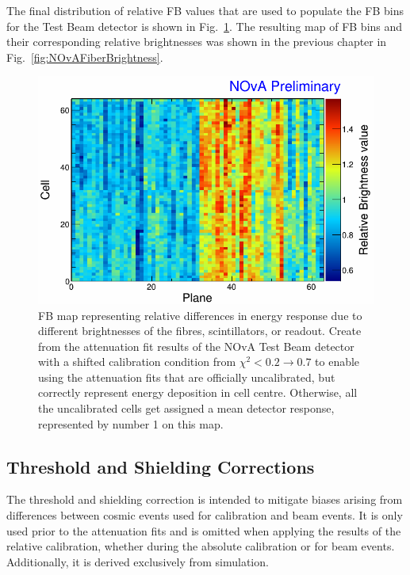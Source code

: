 The final distribution of relative \gls{FB} values that are used to populate the \gls{FB} bins for the Test Beam detector is shown in Fig.~\ref{fig:TBFiberBrightnessMap}. The resulting map of \gls{FB} bins and their corresponding relative brightnesses was shown in the previous chapter in Fig.~\ref{fig:NOvAFiberBrightness}.

\begin{figure}[hbtp]
\centering
\includegraphics[width=.8\textwidth]{Plots/TBCalibration/TBFiberBrightnessMap.png}
\caption[Fibre Brightness map for the Test Beam detector]{\acrshort{FB} map representing relative differences in energy response due to different brightnesses of the fibres, scintillators, or readout. Create from the attenuation fit results of the \acrshort{NOvA} Test Beam detector with a shifted calibration condition from $\chi^2<0.2\rightarrow 0.7$ to enable using the attenuation fits that are officially uncalibrated, but correctly represent energy deposition in cell centre. Otherwise, all the uncalibrated cells get assigned a mean detector response, represented by number 1 on this map.}
\label{fig:TBFiberBrightnessMap}
\end{figure}

\subsection{Threshold and Shielding Corrections}\label{sec:TBThresholdCorrection}
The threshold and shielding correction is intended to mitigate biases arising from differences between cosmic events used for calibration and beam events. It is only used prior to the attenuation fits and is omitted when applying the results of the relative calibration, whether during the absolute calibration or for beam events. Additionally, it is derived exclusively from simulation.

